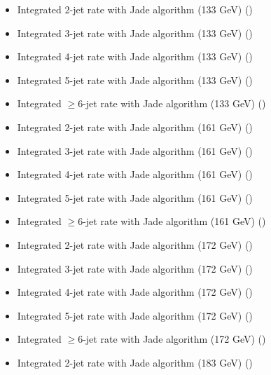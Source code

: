 \begin{itemize}
  \item Integrated 2-jet rate with Jade algorithm (133 GeV) ({\smaller {}})
  \item Integrated 3-jet rate with Jade algorithm (133 GeV) ({\smaller {}})
  \item Integrated 4-jet rate with Jade algorithm (133 GeV) ({\smaller {}})
  \item Integrated 5-jet rate with Jade algorithm (133 GeV) ({\smaller {}})
  \item Integrated $\geq$6-jet rate with Jade algorithm (133 GeV) ({\smaller {}})
  \item Integrated 2-jet rate with Jade algorithm (161 GeV) ({\smaller {}})
  \item Integrated 3-jet rate with Jade algorithm (161 GeV) ({\smaller {}})
  \item Integrated 4-jet rate with Jade algorithm (161 GeV) ({\smaller {}})
  \item Integrated 5-jet rate with Jade algorithm (161 GeV) ({\smaller {}})
  \item Integrated $\geq$6-jet rate with Jade algorithm (161 GeV) ({\smaller {}})
  \item Integrated 2-jet rate with Jade algorithm (172 GeV) ({\smaller {}})
  \item Integrated 3-jet rate with Jade algorithm (172 GeV) ({\smaller {}})
  \item Integrated 4-jet rate with Jade algorithm (172 GeV) ({\smaller {}})
  \item Integrated 5-jet rate with Jade algorithm (172 GeV) ({\smaller {}})
  \item Integrated $\geq$6-jet rate with Jade algorithm (172 GeV) ({\smaller {}})
  \item Integrated 2-jet rate with Jade algorithm (183 GeV) ({\smaller {}})

\end{itemize}
